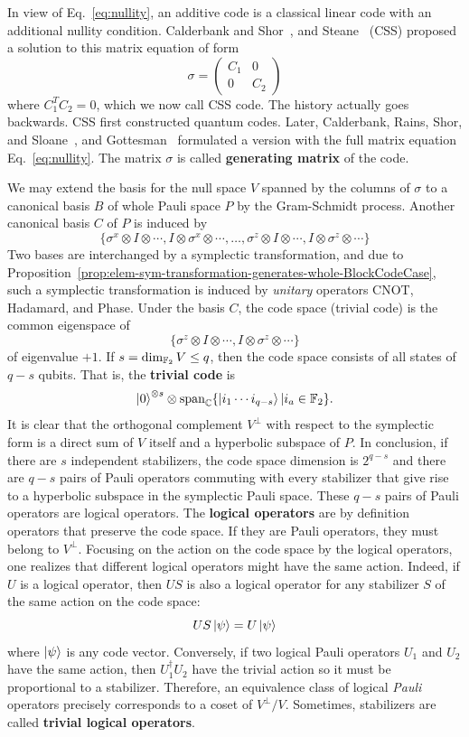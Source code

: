 In view of Eq.~\eqref{eq:nullity},
an additive code is a classical linear code with an additional nullity condition.
Calderbank and Shor~\cite{CalderbankShor1996Good}, and Steane~\cite{Steane1996Multiple}
(CSS) proposed a solution to this matrix equation of form
\[
 \sigma = \begin{pmatrix} C_1 & 0 \\ 0 & C_2 \end{pmatrix}
\]
where $C_1^T C_2 = 0$, which we now call CSS code.
The history actually goes backwards.
CSS first constructed quantum codes.
Later, Calderbank, Rains, Shor, and Sloane~\cite{CalderbankRainsShorEtAl1997Quantum},
and Gottesman~\cite{Gottesman1996Saturating} 
formulated a version with the full matrix equation Eq.~\eqref{eq:nullity}.
The matrix $\sigma$ is called {\bf generating matrix} of the code.

We may extend the basis for the null space $V$ spanned by the columns of $\sigma$
to a canonical basis $B$ of whole Pauli space $P$
by the Gram-Schmidt process.
Another canonical basis $C$ of $P$ is induced by
\[
 \{ \sigma^x \otimes I \otimes \cdots, I \otimes \sigma^x \otimes \cdots, \ldots, 
  \sigma^z \otimes I \otimes \cdots, I \otimes \sigma^z \otimes \cdots \}
\]
Two bases are interchanged by a symplectic transformation,
and due to Proposition~\ref{prop:elem-sym-transformation-generates-whole-BlockCodeCase},
such a symplectic transformation is induced by \emph{unitary} operators CNOT, Hadamard, and Phase.
Under the basis $C$, the code space ({trivial code}) is the common eigenspace of
\[
 \{ \sigma^z \otimes I \otimes \cdots, I \otimes \sigma^z \otimes \cdots \}
\]
of eigenvalue $+1$.
If $s = \dim_{\mathbb{F}_2} V \le q$, then the code space consists of all states of $q-s$ qubits.
That is, the {\bf trivial code} is
\[
 \left| {0} \right\rangle^{\otimes s} \otimes \mathop{\mathrm{span}}\nolimits _\mathbb{C} \{ \left| {i_1 \cdots i_{q-s} } \right\rangle | i_a \in \mathbb{F}_2 \} .
\]
It is clear that the orthogonal complement $V^\perp$ with respect to the symplectic form
is a direct sum of $V$ itself and a hyperbolic subspace of $P$.
In conclusion, if there are $s$ independent stabilizers,
the code space dimension is $2^{q-s}$ and there are $q-s$ pairs of Pauli operators
commuting with every stabilizer
that give rise to a hyperbolic subspace in the symplectic Pauli space.
These $q-s$ pairs of Pauli operators are logical operators.
The {\bf logical operators} are by definition operators that preserve the code space.
If they are Pauli operators, they must belong to $V^\perp$.
Focusing on the action on the code space by the logical operators,
one realizes that different logical operators might have the same action.
Indeed, if $U$ is a logical operator,
then $US$ is also a logical operator for any stabilizer $S$ of the same action on the code space:
\[
 U S \left| {\psi} \right\rangle = U \left| {\psi} \right\rangle
\]
where $\left| {\psi} \right\rangle$ is any code vector.
Conversely, if two logical Pauli operators $U_1$ and $U_2$ have the same action,
then $U_1^\dagger U_2$ have the trivial action so it must be proportional to a stabilizer.
Therefore, an equivalence class of logical \emph{Pauli} operators 
precisely corresponds to a coset of $V^\perp / V$.
Sometimes, stabilizers are called {\bf trivial logical operators}.

